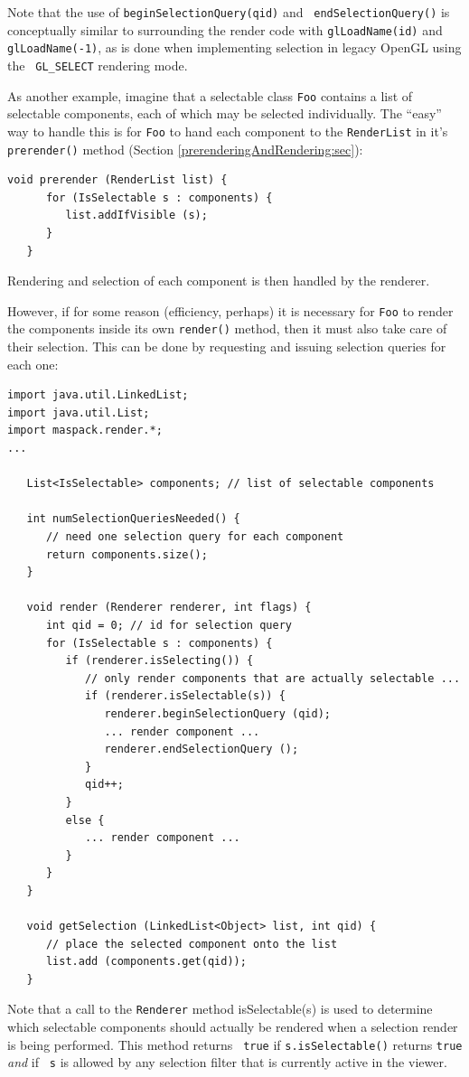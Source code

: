 Note that the use of {\tt beginSelectionQuery(qid)} and {\tt
endSelectionQuery()} is conceptually similar to surrounding the render
code with {\tt glLoadName(id)} and {\tt glLoadName(-1)}, as is done
when implementing selection in legacy OpenGL using the {\tt
GL\_SELECT} rendering mode.

As another example, imagine that a selectable class {\tt Foo}
contains a list of selectable components, each of which may be
selected individually.  The ``easy'' way to handle this is for 
{\tt Foo} to hand each component to the {\tt RenderList} in
it's {\tt prerender()} method (Section \ref{prerenderingAndRendering:sec}):
\begin{lstlisting}[]
   void prerender (RenderList list) {
      for (IsSelectable s : components) {
         list.addIfVisible (s);
      }
   }
\end{lstlisting}
Rendering and selection of each component is then handled by
the renderer.

However, if for some reason (efficiency, perhaps) it is necessary
for {\tt Foo} to render the components inside its own
{\tt render()} method, then it must also
take care of their selection. This can be done by requesting
and issuing selection queries for each one:
\begin{lstlisting}[]
import java.util.LinkedList;
import java.util.List;
import maspack.render.*;
...

   List<IsSelectable> components; // list of selectable components

   int numSelectionQueriesNeeded() {
      // need one selection query for each component
      return components.size();
   }

   void render (Renderer renderer, int flags) {
      int qid = 0; // id for selection query
      for (IsSelectable s : components) {
         if (renderer.isSelecting()) {
            // only render components that are actually selectable ...
            if (renderer.isSelectable(s)) {
               renderer.beginSelectionQuery (qid);
               ... render component ...
               renderer.endSelectionQuery ();
            }
            qid++;
         }
         else {
            ... render component ...
         }
      }
   }

   void getSelection (LinkedList<Object> list, int qid) {
      // place the selected component onto the list
      list.add (components.get(qid));
   }
\end{lstlisting}
Note that a call to the {\tt Renderer} method
%
{isSelectable(s)} is used to
determine which selectable components should actually be rendered when
a selection render is being performed.  This method returns {\tt
true} if {\tt s.isSelectable()} returns {\tt true} {\it and} if {\tt
s} is allowed by any selection filter that is currently active in
the viewer. 

